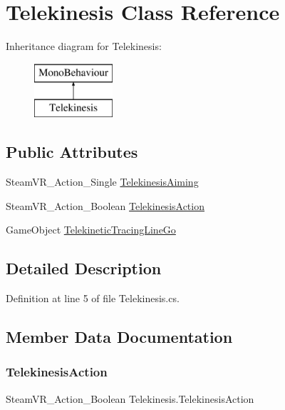 \hypertarget{class_telekinesis}{}\section{Telekinesis Class Reference}
\label{class_telekinesis}
Inheritance diagram for Telekinesis\+:\begin{figure}[H]
\begin{center}
\leavevmode
\includegraphics[height=2.000000cm]{class_telekinesis}
\end{center}
\end{figure}
\subsection*{Public Attributes}
\begin{DoxyCompactItemize}
\item 
Steam\+V\+R\+\_\+\+Action\+\_\+\+Single \mbox{\hyperlink{class_telekinesis_a7a53fb30be87da42a5c0f1c353961436}{Telekinesis\+Aiming}}
\item 
Steam\+V\+R\+\_\+\+Action\+\_\+\+Boolean \mbox{\hyperlink{class_telekinesis_aefc0f3d4b7ed0cb34ae46de26258bdf8}{Telekinesis\+Action}}
\item 
Game\+Object \mbox{\hyperlink{class_telekinesis_a4a511b637671edf2a8223b53f406fca6}{Telekinetic\+Tracing\+Line\+Go}}
\end{DoxyCompactItemize}


\subsection{Detailed Description}


Definition at line 5 of file Telekinesis.\+cs.



\subsection{Member Data Documentation}
\mbox{\label{class_telekinesis_aefc0f3d4b7ed0cb34ae46de26258bdf8}} 
\subsubsection{\texorpdfstring{TelekinesisAction}{TelekinesisAction}}
{\footnotesize\ttfamily Steam\+V\+R\+\_\+\+Action\+\_\+\+Boolean Telekinesis.\+Telekinesis\+Action}



